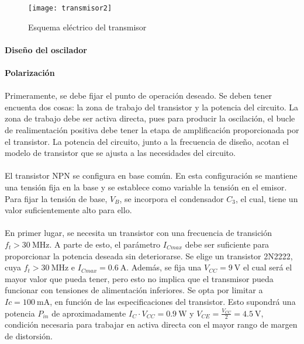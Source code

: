 \begin{figure}[h]
    \centering
    \texttt{[image: transmisor2]}
    \caption{Esquema el\'ectrico del transmisor}
    \label{fig:tx}
\end{figure}

\paragraph{Diseño del oscilador}
\paragraph{Polarizaci\'on} %
\paragraph{}
Primeramente, se debe fijar el punto de operación deseado. Se deben tener encuenta dos cosas: la zona de trabajo del transistor y la potencia del circuito. La zona de trabajo debe ser activa directa, pues para producir la oscilación, el bucle de realimentación positiva debe tener la etapa de amplificación proporcionada por el transistor. La potencia del circuito, junto a la frecuencia de diseño, acotan el modelo de transistor que se ajusta a las necesidades del circuito.
\paragraph{}
El transistor NPN se configura en base com\'un. En esta configuraci\'on se mantiene una tensión fija en la base y se establece como variable la tensi\'on en el emisor. Para fijar la tensión de base, $V_B$, se incorpora el condensador $C_3$, el cual, tiene un valor suficientemente alto para ello.
\paragraph{}
En primer lugar, se necesita un transistor con una frecuencia de transición $f_t > \SI{30}{\mega\hertz}$. 
A parte de esto, el parámetro $I_{Cmax}$ debe ser suficiente para proporcionar la potencia deseada sin deteriorarse. Se elige un transistor 2N2222, cuya $f_t > \SI{30}{\mega\hertz}$ e $I_{Cmax} = \SI{0.6}{\ampere}$. Adem\'as, se fija una $V_{CC} = \SI{9}{\volt}$ el cual ser\'a el mayor valor que pueda tener, pero esto no implica que el transmisor pueda funcionar con tensiones de alimentaci\'on inferiores. Se opta por limitar a $Ic = \SI{100}{\milli\ampere}$, en funci\'on de las especificaciones del transistor. Esto supondr\'a una potencia $P_{in}$ de aproximadamente $I_C \cdot V_{CC} = \SI{0.9}{\watt}$ y $V_{CE} = \frac{V_{CC}}{2} = \SI{4.5}{\volt}$, condici\'on necesaria para trabajar en activa directa con el mayor rango de margen de distorsi\'on. 
